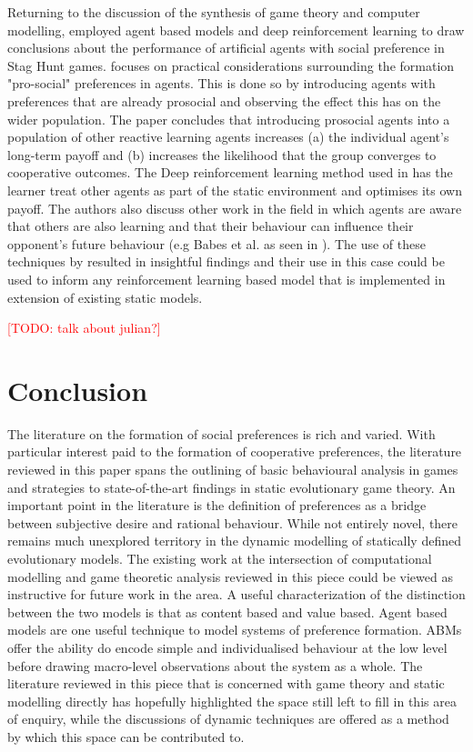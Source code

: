 \documentclass[11pt]{article}
\newcommand{\todo}[1]{\textcolor{red}{[TODO: #1]}\PackageWarning{TODO:}{#1!}}
\newcommand*{\np}{\par\noindent\newline}
\begin{document}
\np Returning to the discussion of the synthesis of game theory and computer modelling, \citep
{peysakhovich_prosocial_2017} employed agent based models and deep reinforcement learning to draw conclusions about the
performance of artificial agents with social preference in Stag Hunt games. \citet{peysakhovich_prosocial_2017} focuses
on practical considerations surrounding the formation "pro-social" preferences in agents. This is done so by introducing
agents with preferences that are already prosocial and observing the effect this has on the wider population. The paper
concludes that introducing prosocial agents into a population of other reactive learning agents increases (a) the
individual agent's long-term payoff and (b) increases the likelihood that the group converges to cooperative outcomes.
The Deep reinforcement learning method used in \citet{peysakhovich_prosocial_2017} has the learner treat other agents as
part of the static environment and optimises its own payoff. The authors also discuss other work in the field in which
agents are aware that others are also learning and that their behaviour can influence their opponent's future behaviour
(e.g Babes et al. as seen in \citealt{peysakhovich_prosocial_2017}). The use of these techniques by 
\citet{peysakhovich_prosocial_2017} resulted in insightful findings and their use in this case could be used to inform any reinforcement learning based model that is implemented in extension of existing static models.


\todo{talk about julian?}

\section{Conclusion}\label{conc}
The literature on the formation of social preferences is rich and varied. With particular interest paid to the formation
of cooperative preferences, the literature reviewed in this paper spans the outlining of basic behavioural analysis in
games and strategies to state-of-the-art findings in static evolutionary game theory. An important point in the
literature is the definition of preferences as a bridge between subjective desire and rational behaviour. While not
entirely novel, there remains much unexplored territory in the dynamic modelling of statically defined evolutionary
models. The existing work at the intersection of computational modelling and game theoretic analysis reviewed in this
piece could be viewed as instructive for future work in the area. A useful characterization of the distinction between
the two models is that as content based and value based. Agent based models are one useful technique to model systems of
preference formation. ABMs offer the ability do encode simple and individualised behaviour at the low level before
drawing macro-level observations about the system as a whole. The literature reviewed in this piece that is concerned
with game theory and static modelling directly has hopefully highlighted the space still left to fill in this area of
enquiry, while the discussions of dynamic techniques are offered as a method by which this space can be contributed to.
 
\newpage


\end{document}
